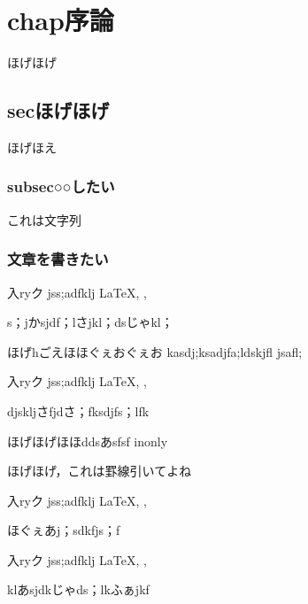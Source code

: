 \chapter{chap序論}
ほげほげ
\section{secほげほげ}
ほげほえ

\subsection{subsec○○したい}



\begin{usage}
\usepackage{$\<パッケージ名>$}

 これは文字列

\end{usage}


\subsection{文章を書きたい}



\begin{inout}
 入ryク
jss;adfklj
\LaTeX, \XeTeX, 
\end{inout}
s；jかsjdf；lさjkl；dsじゃkl；

\begin{inonly}
 ほげhごえほほぐぇおぐぇお
kasdj;ksadjfa;ldskjfl
jsafl;
\end{inonly}
\begin{outonly}
 入ryク
jss;adfklj
\LaTeX, \XeTeX,  
\end{outonly}

djskljさfjdさ；fksdjfs；lfk
\begin{inonly}
ほげほげほほddsあsfsf
inonly 
\end{inonly}
ほげほげ，これは罫線引いてよね

\begin{outonly*}
 入ryク
jss;adfklj
\LaTeX, \XeTeX,  
\end{outonly*}


ほぐぇあj；sdkfjs；f
\begin{intext}
  入ryク
 jss;adfklj
 \LaTeX, \XeTeX, 
\end{intext}
klあsjdkじゃds；lkふぁjkf